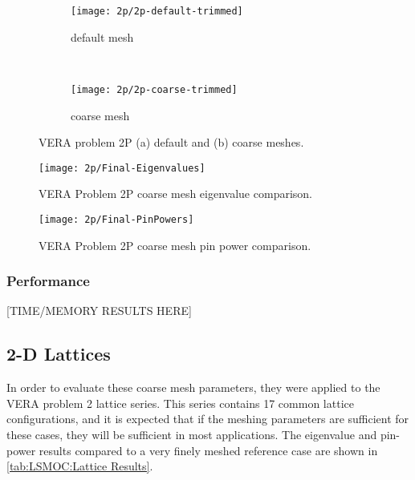 {{{{{          \begin{figure}[h]
            \centering
            \begin{subfigure}[t]{0.45\textwidth}
                \centering
                \texttt{[image: 2p/2p-default-trimmed]}
                \caption{default mesh\label{fig:LSMOC:2p:Default Mesh}}
            \end{subfigure}%
            ~
            \begin{subfigure}[t]{0.45\textwidth}
                \centering
                \texttt{[image: 2p/2p-coarse-trimmed]}
                \caption{coarse mesh\label{fig:LSMOC:2p:Coarse Mesh}}
            \end{subfigure}
            \caption{VERA problem 2P (a) default and (b) coarse meshes.\label{figs:LSMOC:2p:Meshes}}
          \end{figure}

          \begin{figure}
            \centering
            \texttt{[image: 2p/Final-Eigenvalues]}
            \caption{VERA Problem 2P coarse mesh eigenvalue comparison. \label{fig:LSMOC:2P:Coarse Mesh:Eigenvalues}}
          \end{figure}
          \begin{figure}
            \centering
            \texttt{[image: 2p/Final-PinPowers]}
            \caption{VERA Problem 2P coarse mesh pin power comparison. \label{fig:LSMOC:2P:Coarse Mesh:PinPowers}}
          \end{figure}
        }
      }

      \subsubsection{Performance}{\label{sssec:Performance}
        [TIME/MEMORY RESULTS HERE]
      }
    }

    \subsection{2-D Lattices}{\label{ssec:LSMOC:2-D Lattices}
      In order to evaluate these coarse mesh parameters, they were applied to the \ac{VERA} problem 2 lattice series.
      This series contains 17 common lattice configurations, and it is expected that if the meshing parameters are sufficient for these cases, they will be sufficient in most applications.
      The eigenvalue and pin-power results compared to a very finely meshed reference case are shown in \cref{tab:LSMOC:Lattice Results}.

}}}
